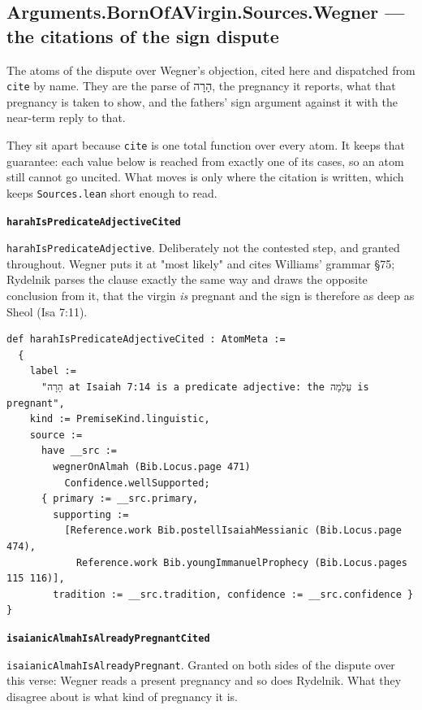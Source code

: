 \documentclass[11pt]{article}
\begin{document}
\subsection*{Arguments.BornOfAVirgin.Sources.Wegner — the citations of the sign dispute}
The atoms of the dispute over Wegner's objection, cited here and dispatched from \texttt{cite} by name. They are the parse of הָרָה, the pregnancy it reports, what that pregnancy is taken to show, and the fathers' sign argument against it with the near-term reply to that.

They sit apart because \texttt{cite} is one total function over every atom. It keeps that guarantee: each value below is reached from exactly one of its cases, so an atom still cannot go uncited. What moves is only where the citation is written, which keeps \texttt{Sources.lean} short enough to read.

\par\medskip\noindent\textbf{\texttt{harah\allowbreak{}Is\allowbreak{}Predicate\allowbreak{}Adjective\allowbreak{}Cited}}\par\nobreak\noindent
\texttt{harah\allowbreak{}Is\allowbreak{}Predicate\allowbreak{}Adjective}. Deliberately not the contested step, and granted throughout. Wegner puts it at "most likely" and cites Williams' grammar §75; Rydelnik parses the clause exactly the same way and draws the opposite conclusion from it, that the virgin \emph{is} pregnant and the sign is therefore as deep as Sheol (Isa 7:11).

{\small\begin{verbatim}
def harahIsPredicateAdjectiveCited : AtomMeta :=
  {
    label :=
      "הָרָה at Isaiah 7:14 is a predicate adjective: the עַלְמָה is pregnant",
    kind := PremiseKind.linguistic,
    source :=
      have __src :=
        wegnerOnAlmah (Bib.Locus.page 471)
          Confidence.wellSupported;
      { primary := __src.primary,
        supporting :=
          [Reference.work Bib.postellIsaiahMessianic (Bib.Locus.page 474),
            Reference.work Bib.youngImmanuelProphecy (Bib.Locus.pages 115 116)],
        tradition := __src.tradition, confidence := __src.confidence } }
\end{verbatim}}
\par\medskip\noindent\textbf{\texttt{isaianic\allowbreak{}Almah\allowbreak{}Is\allowbreak{}Already\allowbreak{}Pregnant\allowbreak{}Cited}}\par\nobreak\noindent
\texttt{isaianic\allowbreak{}Almah\allowbreak{}Is\allowbreak{}Already\allowbreak{}Pregnant}. Granted on both sides of the dispute over this verse: Wegner reads a present pregnancy and so does Rydelnik. What they disagree about is what kind of pregnancy it is.
\end{document}
